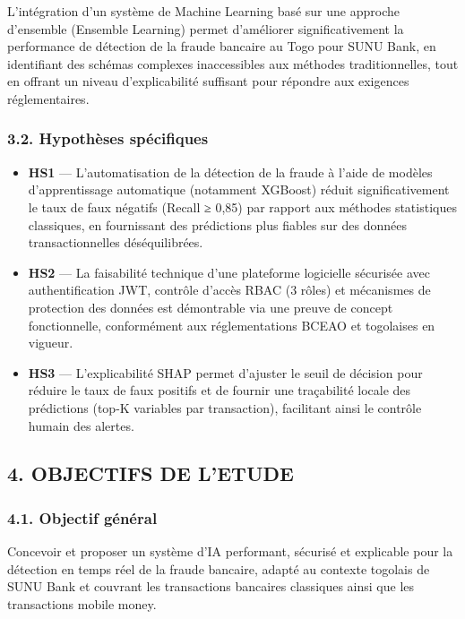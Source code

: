\documentclass[
  12pt,
]{article}
\providecommand{\tightlist}{%
  \setlength{\itemsep}{0pt}\setlength{\parskip}{0pt}}
\begin{document}
L’intégration d’un système de Machine Learning basé sur une approche
d’ensemble (Ensemble Learning) permet d’améliorer significativement la
performance de détection de la fraude bancaire au Togo pour SUNU Bank,
en identifiant des schémas complexes inaccessibles aux méthodes
traditionnelles, tout en offrant un niveau d’explicabilité suffisant
pour répondre aux exigences réglementaires.

\subsubsection{3.2. Hypothèses
spécifiques}\label{hypothuxe8ses-spuxe9cifiques}

\begin{itemize}
\tightlist
\item
  \textbf{HS1} — L’automatisation de la détection de la fraude à l’aide
  de modèles d’apprentissage automatique (notamment XGBoost) réduit
  significativement le taux de faux négatifs (Recall ≥ 0,85) par rapport
  aux méthodes statistiques classiques, en fournissant des prédictions
  plus fiables sur des données transactionnelles déséquilibrées.
\item
  \textbf{HS2} — La faisabilité technique d’une plateforme logicielle
  sécurisée avec authentification JWT, contrôle d’accès RBAC (3 rôles)
  et mécanismes de protection des données est démontrable via une preuve
  de concept fonctionnelle, conformément aux réglementations BCEAO et
  togolaises en vigueur.
\item
  \textbf{HS3} — L’explicabilité SHAP permet d’ajuster le seuil de
  décision pour réduire le taux de faux positifs et de fournir une
  traçabilité locale des prédictions (top-K variables par transaction),
  facilitant ainsi le contrôle humain des alertes.
\end{itemize}

\subsection{4. OBJECTIFS DE L’ETUDE}\label{objectifs-de-letude}

\subsubsection{4.1. Objectif général}\label{objectif-guxe9nuxe9ral}

Concevoir et proposer un système d’IA performant, sécurisé et explicable
pour la détection en temps réel de la fraude bancaire, adapté au
contexte togolais de SUNU Bank et couvrant les transactions bancaires
classiques ainsi que les transactions mobile money.
\end{document}
